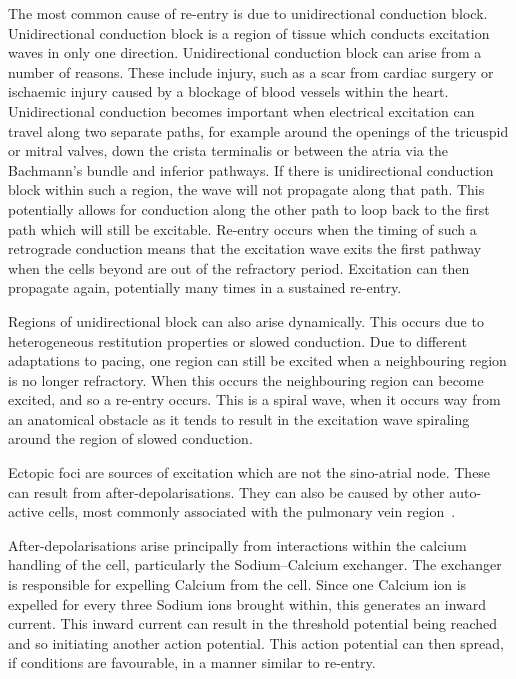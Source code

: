 The most common cause of re-entry is due to unidirectional conduction block.
Unidirectional conduction block is a region of tissue which conducts excitation
waves in only one direction.
Unidirectional conduction block can arise from a number of reasons.
These include injury, such as a scar from cardiac surgery or ischaemic injury
caused by a blockage of blood vessels within the heart.
Unidirectional conduction becomes important when electrical excitation can
travel along two separate paths, for example around the openings of the
tricuspid or mitral valves, down the crista terminalis or between the atria via
the Bachmann's bundle and inferior pathways.
If there is unidirectional conduction block within such a region, the wave will
not propagate along that path.
This potentially allows for conduction along the other path to loop back to the
first path which will still be excitable.
Re-entry occurs when the timing of such a retrograde conduction means that the
excitation wave exits the first pathway when the cells beyond are out of the
refractory period.
Excitation can then propagate again, potentially many times in a sustained
re-entry.

Regions of unidirectional block can also arise dynamically.
This occurs due to heterogeneous restitution properties or slowed conduction.
Due to different adaptations to pacing, one region can still be excited
when a neighbouring region is no longer refractory.
When this occurs the neighbouring region can become excited, and so a re-entry
occurs.
This is a spiral wave, when it occurs way from an anatomical obstacle as it
tends to result in the excitation wave spiraling around the region of slowed
conduction.

Ectopic foci are sources of excitation which are not the sino-atrial node.
These can result from after-depolarisations.
They can also be caused by other auto-active cells, most commonly associated
with the pulmonary vein region~\cite{Haissaguerre1998}.

After-depolarisations arise principally from interactions within the calcium
handling of the cell, particularly the Sodium--Calcium exchanger.
The exchanger is responsible for expelling Calcium from the cell.
Since one Calcium ion is expelled for every three Sodium ions brought within,
this generates an inward current.
This inward current can result in the threshold potential being reached and so
initiating another action potential.
This action potential can then spread, if conditions are favourable, in a manner
similar to re-entry.

